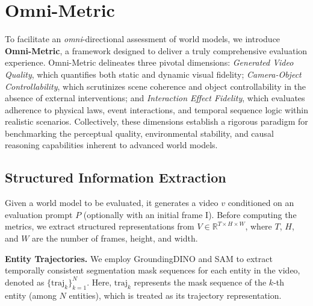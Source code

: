 \section{Omni-Metric}
\label{sec:metrics}





To facilitate an \textit{omni}-directional assessment of world models, we introduce \textbf{Omni-Metric}, a framework designed to deliver a truly comprehensive evaluation experience. Omni-Metric delineates three pivotal dimensions: \textit{Generated Video Quality}, which quantifies both static and dynamic visual fidelity; \textit{Camera-Object Controllability}, which scrutinizes scene coherence and object controllability in the absence of external interventions; and \textit{Interaction Effect Fidelity}, which evaluates adherence to physical laws, event interactions, and temporal sequence logic within realistic scenarios. Collectively, these dimensions establish a rigorous paradigm for benchmarking the perceptual quality, environmental stability, and causal reasoning capabilities inherent to advanced world models.

\subsection{Structured Information Extraction}
\label{sec:metrics_struct_infor}
Given a world model to be evaluated, it generates a video $v$ conditioned on an evaluation prompt $P$ (optionally with an initial frame $\text{I}$).
Before computing the metrics, we extract structured representations from $V \in \mathbb{R}^{T \times H \times W}$, where $T$, $H$, and $W$ are the number of frames, height, and width.



\textbf{Entity Trajectories.} 
We employ GroundingDINO and SAM to extract temporally consistent segmentation mask sequences for each entity in the video, denoted as $\{ \mathrm{traj}_k \}_{k=1}^{N}$. Here, $\mathrm{traj}_k$ represents the mask sequence of the $k$-th entity (among $N$ entities), which is treated as its trajectory representation.

